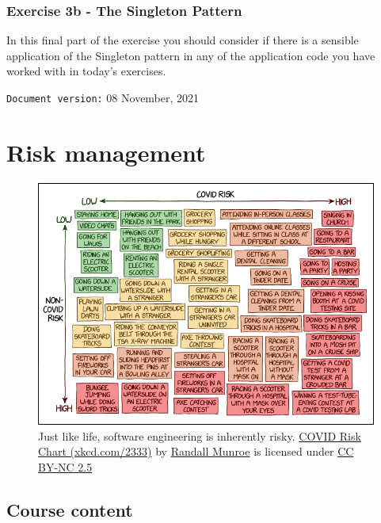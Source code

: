 \documentclass[
]{book}
\begin{document}
\hypertarget{singleton}{%
\subsection{Exercise 3b - The Singleton Pattern}\label{singleton}}

In this final part of the exercise you should consider if there is a sensible application of the Singleton pattern in any of the application code you have worked with in today's exercises.

\texttt{Document\ version:} 08 November, 2021

\hypertarget{risking}{%
\chapter{Risk management}\label{risking}}

\begin{figure}

{\centering \includegraphics[width=0.99\linewidth]{images/covid_risk_chart} 

}

\caption{Just like life, software engineering is inherently risky. \href{https://xkcd.com/2333/}{COVID Risk Chart (xkcd.com/2333)} by \href{https://en.wikipedia.org/wiki/Randall_Munroe}{Randall Munroe} is licensed under \href{https://creativecommons.org/licenses/by-nc/2.5/}{CC BY-NC 2.5}}\label{fig:xkcd-risk-fig}
\end{figure}



\hypertarget{course-content-2}{%
\section{Course content}\label{course-content-2}}
\end{document}
